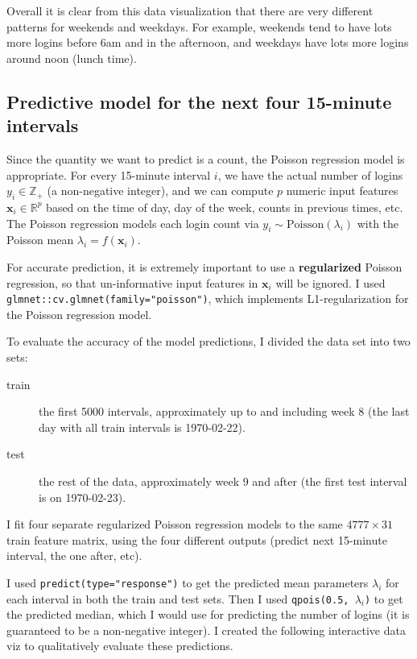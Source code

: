 \documentclass{article}
\begin{document}
Overall it is clear from this data visualization that there are very
different patterns for weekends and weekdays. For example, weekends
tend to have lots more logins before 6am and in the afternoon, and
weekdays have lots more logins around noon (lunch time).

\subsection{Predictive model for the next four 15-minute intervals}

Since the quantity we want to predict is a count, the Poisson
regression model is appropriate. For every 15-minute interval $i$, we
have the actual number of logins $y_i\in\mathbb Z_+$ (a non-negative
integer), and we can compute $p$ numeric input features
$\mathbf x_i\in\mathbb R^p$ based on the time of day, day of the week,
counts in previous times, etc. The Poisson regression models each
login count via $y_i \sim \text{Poisson}(\lambda_i)$ with the Poisson
mean $\lambda_i = f(\mathbf x_i)$.

For accurate prediction, it is extremely important to use a
\textbf{regularized} Poisson regression, so that un-informative input
features in $\mathbf x_i$ will be ignored. I used
\texttt{glmnet::cv.glmnet(family="poisson")}, which implements
L1-regularization for the Poisson regression model.

To evaluate the accuracy of the model predictions, I divided the data
set into two sets:
\begin{description}
\item[train] the first 5000 intervals, approximately up to and
  including week 8 (the last day with all train intervals is
  1970-02-22).
\item[test] the rest of the data, approximately week 9 and after (the
  first test interval is on 1970-02-23).
\end{description}
I fit four separate regularized Poisson regression models to the same
$4777\times 31$ train feature matrix, using the four different outputs
(predict next 15-minute interval, the one after, etc).

I used \texttt{predict(type="response")} to get the predicted mean
parameters $\lambda_i$ for each interval in both the train and test
sets. Then I used \texttt{qpois(0.5, $\lambda_i$)} to get the
predicted median, which I would use for predicting the number of
logins (it is guaranteed to be a non-negative integer). I created the
following interactive data viz to qualitatively evaluate these predictions.
\end{document}
